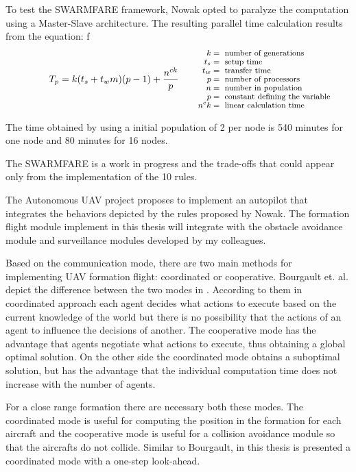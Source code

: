 To test the SWARMFARE framework, Nowak opted to paralyze the computation
using a Master-Slave architecture. The resulting parallel time calculation
results from the equation:
f
\begin{equation}
T_{p} = k (t_{s}+t_{w}m)(p-1) + \frac{n^{ck}}{p}
\qquad\parbox{4.0cm}{\footnotesize$\begin{aligned} 
 k &= \text{ number of generations}
  \\[-1.0ex] t_{s} &= \text{ setup time}
  \\[-1.0ex] t_{w} &= \text{ transfer time}
  \\[-1.0ex] p &= \text{ number of processors}
  \\[-1.0ex] n &= \text{ number in population}
  \\[-1.0ex] p &= \text{ constant defining the variable}
  \\[-1.0ex] n^ck &= \text{ linear calculation time}
\end{aligned}$}
\label{eqn: nowak-paralel-time}
\end{equation}

The time obtained by using a initial population of 2 per node
is 540 minutes for one node and 80 minutes for 16 nodes.

The SWARMFARE is a work in progress and the trade-offs that could appear only
from the implementation of the 10 rules. 

The Autonomous UAV project proposes to implement an autopilot that integrates
the behaviors depicted by the rules proposed by Nowak. The formation flight module
implement in this thesis will integrate with the obstacle avoidance module and
surveillance modules developed by my colleagues.

Based on the communication mode, there are two main methods for implementing 
UAV formation flight: coordinated or cooperative. Bourgault et. al. depict the
difference between the two modes in \cite{bayesian}. According to them
in coordinated approach each agent decides what actions to execute based
on the current knowledge of the world but there is no possibility that the actions
of an agent to influence the decisions of another. The cooperative mode has the
advantage that agents negotiate what actions to execute, thus obtaining a 
global optimal solution. On the other side the coordinated mode obtains a 
suboptimal solution, but has the advantage that the individual computation 
time does not increase with the number of agents.

For a close range formation there are necessary both these modes. The coordinated
mode is useful for computing the position in the formation for each aircraft 
and the cooperative mode is useful for a collision avoidance module so that
the aircrafts do not collide. Similar to Bourgault,  in this thesis is presented
a coordinated mode with a one-step look-ahead.

